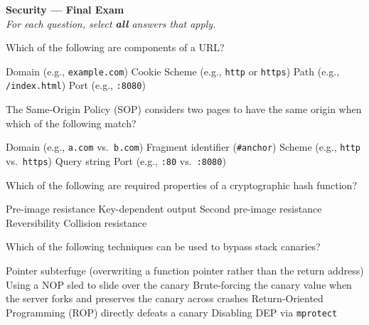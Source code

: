\documentclass[addpoints]{exam}
\begin{document}
\begin{center}
  {\Large \textbf{Security --- Final Exam}}\\[0.5em]
  {\large \textit{For each question, select \textbf{all} answers that apply.}}
\end{center}

\vspace{1em}

\begin{questions}
\question Which of the following are components of a URL?

\begin{checkboxes}
  \CorrectChoice Domain (e.g., \texttt{example.com})
  \choice Cookie
  \CorrectChoice Scheme (e.g., \texttt{http} or \texttt{https})
  \CorrectChoice Path (e.g., \texttt{/index.html})
  \CorrectChoice Port (e.g., \texttt{:8080})
\end{checkboxes}


\question The Same-Origin Policy (SOP) considers two pages to have the same origin when which of the following match?

\begin{checkboxes}
  \CorrectChoice Domain (e.g., \texttt{a.com} vs.\ \texttt{b.com})
  \choice Fragment identifier (\texttt{\#anchor})
  \CorrectChoice Scheme (e.g., \texttt{http} vs.\ \texttt{https})
  \choice Query string
  \CorrectChoice Port (e.g., \texttt{:80} vs.\ \texttt{:8080})
\end{checkboxes}


\question Which of the following are required properties of a cryptographic hash function?

\begin{checkboxes}
  \CorrectChoice Pre-image resistance
  \choice Key-dependent output
  \CorrectChoice Second pre-image resistance
  \choice Reversibility
  \CorrectChoice Collision resistance
\end{checkboxes}


\question Which of the following techniques can be used to bypass stack canaries?

\begin{checkboxes}
  \CorrectChoice Pointer subterfuge (overwriting a function pointer rather than the return address)
  \choice Using a NOP sled to slide over the canary
  \CorrectChoice Brute-forcing the canary value when the server forks and preserves the canary across crashes
  \choice Return-Oriented Programming (ROP) directly defeats a canary
  \choice Disabling DEP via \texttt{mprotect}
\end{checkboxes}



\end{questions}
\end{document}
